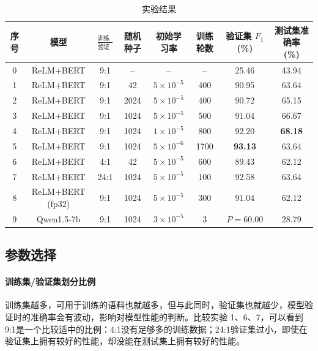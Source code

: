 \documentclass{sjtuarticle}
\begin{document}
\begin{table}[h]
    \centering
    \caption{实验结果}
    \label{tab:relmres}
    \begin{tabular}{cccccccc}
        \toprule
        序号 & 模型  & $\frac{\text{训练集}}{\text{验证集}}$ & 随机种子 & 初始学习率 &  训练轮数 & 验证集 $F_1$ (\%) & 测试集准确率 (\%) \\
        \midrule
        0 & ReLM+BERT & 9:1 & -- & -- & -- & 25.46 & 43.94 \\
        1 & ReLM+BERT & 9:1 & 42 & $5\times10^{-5}$ & 400 & 90.95 & 63.64 \\
        2 & ReLM+BERT & 9:1 & 2024 &$5\times10^{-5}$ &  400 & 90.72 & 65.15 \\
        3 & ReLM+BERT & 9:1 & 1024 &$5\times10^{-5}$ &  500 & 91.04 & 66.67 \\
        4 & ReLM+BERT & 9:1 & 1024 &$1\times10^{-5}$ &  800 &  92.20 & \bfseries 68.18 \\
        5 & ReLM+BERT & 9:1 & 1024 & $5\times10^{-6}$ & 1700 & \bfseries 93.13 & 63.64 \\
        \midrule
        6 & ReLM+BERT & 4:1  & 42 & $5\times10^{-5}$ & 600 & 89.43 & 62.12\\
        7 & ReLM+BERT & 24:1 & 1024 & $5\times10^{-5}$ & 100 & 92.58 & 63.64 \\
        8 & ReLM+BERT (fp32) & 9:1 & 1024 & $5\times10^{-5}$ & 300 & 91.04 & 62.12 \\
        \midrule
        9 & Qwen1.5-7b & 9:1 & 1024 & $3\times10^{-5}$ & 3 & $P=60.00$\footnotemark[1] & 28.79 \\
        \bottomrule
    \end{tabular}
\end{table}

\subsection{参数选择}

\paragraph{训练集/验证集划分比例}

训练集越多，可用于训练的语料也就越多，但与此同时，验证集也就越少，模型验证时的准确率会有波动，影响对模型性能的判断。比较实验 1、6、7，可以看到9:1是一个比较适中的比例：4:1没有足够多的训练数据；24:1验证集过小，即使在验证集上拥有较好的性能，却没能在测试集上拥有较好的性能。
\end{document}
